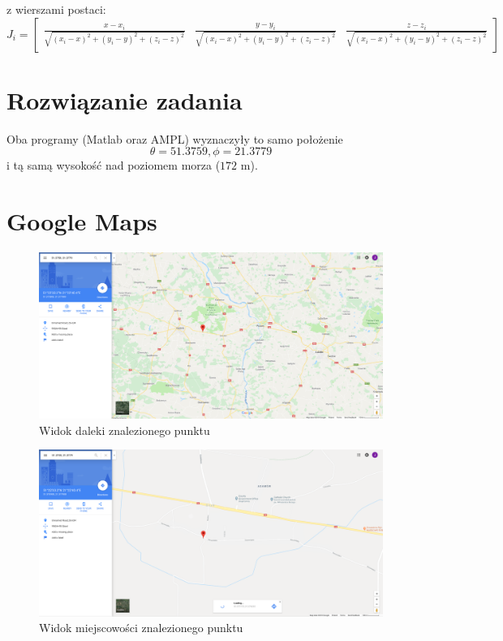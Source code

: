 \documentclass[]{article}
\begin{document}
z wierszami postaci:
\[J_i = \begin{bmatrix} 
	\frac{x - x_i}{\sqrt{(x_i - x)^2 + (y_i - y)^2 + (z_i - z)^2}} & 
	\frac{y - y_i}{\sqrt{(x_i - x)^2 + (y_i - y)^2 + (z_i - z)^2}} & 
	\frac{z - z_i}{\sqrt{(x_i - x)^2 + (y_i - y)^2 + (z_i - z)^2}}
\end{bmatrix} \]

\section{Rozwiązanie zadania}
Oba programy (Matlab oraz AMPL) wyznaczyły to samo położenie 
\[ \theta = 51.3759 , \phi = 21.3779 \] i tą samą wysokość nad poziomem morza ($172$ m).

\section{Google Maps}
\begin{figure}[H]
	\centering
	\includegraphics[width=0.99\linewidth]{daleko}
	\caption{Widok daleki znalezionego punktu}
	\label{fig:daleko}
\end{figure}

\begin{figure}[H]
	\centering
	\includegraphics[width=0.99\linewidth]{blisko}
	\caption{Widok miejscowości znalezionego punktu}
	\label{fig:blisko}
\end{figure}
\end{document}
